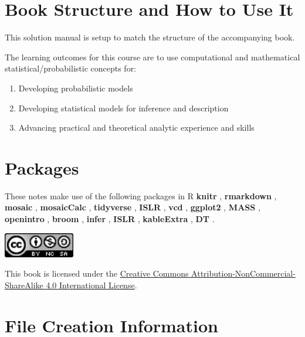 \documentclass[
]{book}
\providecommand{\tightlist}{%
  \setlength{\itemsep}{0pt}\setlength{\parskip}{0pt}}
\begin{document}
\hypertarget{book-structure-and-how-to-use-it}{%
\section{Book Structure and How to Use It}\label{book-structure-and-how-to-use-it}}

This solution manual is setup to match the structure of the accompanying book.

The learning outcomes for this course are to use computational and mathematical statistical/probabilistic concepts for:

\begin{enumerate}
\def\labelenumi{\alph{enumi}.}
\tightlist
\item
  Developing probabilistic models
\item
  Developing statistical models for inference and description
\item
  Advancing practical and theoretical analytic experience and skills
\end{enumerate}

\hypertarget{packages}{%
\section{Packages}\label{packages}}

These notes make use of the following packages in R \textbf{knitr} \citep{R-knitr}, \textbf{rmarkdown} \citep{R-rmarkdown}, \textbf{mosaic} \citep{R-mosaic}, \textbf{mosaicCalc} \citep{R-mosaicCalc}, \textbf{tidyverse} \citep{R-tidyverse}, \textbf{ISLR} \citep{R-ISLR}, \textbf{vcd} \citep{R-vcd}, \textbf{ggplot2} \citep{R-ggplot2}, \textbf{MASS} \citep{R-MASS}, \textbf{openintro} \citep{R-openintro}, \textbf{broom} \citep{R-broom}, \textbf{infer} \citep{R-infer}, \textbf{ISLR} \citep{R-ISLR}, \textbf{kableExtra} \citep{R-kableExtra}, \textbf{DT} \citep{R-DT}.

\includegraphics[width=1.22in]{./figures/by-nc-sa}

This book is licensed under the \href{http://creativecommons.org/licenses/by-nc-sa/4.0/}{Creative Commons Attribution-NonCommercial-ShareAlike 4.0 International License}.

\hypertarget{file-creation-information}{%
\section{File Creation Information}\label{file-creation-information}}
\end{document}
